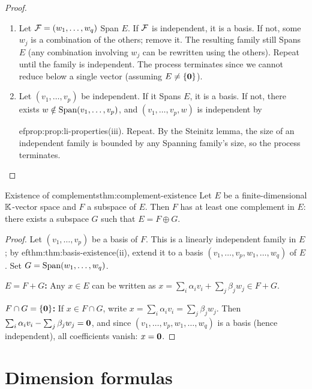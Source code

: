 \begin{proof}
\begin{enumerate}[label=(\roman*)]
  \item Let ${\mathcal{F}} = (w_1,\ldots,w_q)$ Span $E$. If ${\mathcal{F}}$ is independent,
    it is a basis. If not, some $w_j$ is a combination of the others;
    remove it. The resulting family still Spans $E$ (any combination
    involving $w_j$ can be rewritten using the others). Repeat until the
    family is independent. The process terminates since we cannot reduce
    below a single vector (assuming $E\neq\left\{\mathbf{0}\right\}$).

  \item Let $(v_1,\ldots,v_p)$ be independent. If it Spans $E$, it is a
    basis. If not, there exists $w\notin\operatorname{Span}(v_1,\ldots,v_p)$, and
    $(v_1,\ldots,v_p,w)$ is independent by
    
ef{prop:prop:li-properties}(iii). Repeat. By the Steinitz lemma, the
    size of an independent family is bounded by any Spanning family's
    size, so the process terminates. \qedhere
\end{enumerate}
\end{proof}

\begin{theorem}{Existence of complements}{thm:complement-existence}
Let $E$ be a finite-dimensional ${\mathbb{K}}$-vector space and $F$ a subspace of
$E$. Then $F$ has at least one complement in $E$: there exists a
subspace $G$ such that $E = F\oplus G$.
\end{theorem}

\begin{proof}
Let $(v_1,\ldots,v_p)$ be a basis of $F$. This is a linearly independent
family in $E$; by 
ef{thm:thm:basis-existence}(ii), extend it to a basis
$(v_1,\ldots,v_p,w_1,\ldots,w_q)$ of $E$. Set
$G = \operatorname{Span}(w_1,\ldots,w_q)$.

\textbf{$E = F+G$:} Any $x\in E$ can be written as
$x = \sum_i\alpha_iv_i + \sum_j\beta_jw_j\in F+G$.

\textbf{$F\cap G = \left\{\mathbf{0}\right\}$:} If $x\in F\cap G$, write
$x = \sum_i\alpha_iv_i = \sum_j\beta_jw_j$. Then
$\sum_i\alpha_iv_i - \sum_j\beta_jw_j = \mathbf{0}$, and since
$(v_1,\ldots,v_p,w_1,\ldots,w_q)$ is a basis (hence independent), all
coefficients vanish: $x = \mathbf{0}$.
\end{proof}


\section{Dimension formulas}\label{sec:dimension-formulas}


